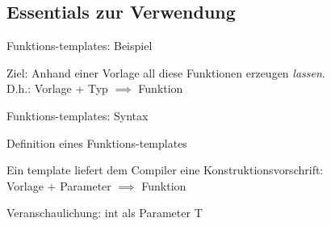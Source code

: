 \subsection{Essentials zur Verwendung}

\begin{frame}[t]{Funktions-templates: Beispiel}


	Ziel: Anhand einer Vorlage all diese Funktionen erzeugen \emph{lassen}.\\
	D.h.: Vorlage + Typ $\implies$ Funktion
	
	\vspace{2em}
	
	\onslide*<+> {  }
	\lstset{morecomment=[l]template}
	\onslide*<+> {  }
	\lstset{deletecomment=[l]template}
	\onslide*<+-> {  }
\end{frame}

\begin{frame}[fragile]{Funktions-templates: Syntax}
	\begin{block}{Definition eines Funktions-templates}
		
	\end{block}
	
	Ein template liefert dem Compiler eine Konstruktionsvorschrift:\\
	Vorlage + Parameter $\implies$ Funktion
	
	\pause
	\vspace{1em}
	
	\begin{block}{Veranschaulichung: int als Parameter T}
		
	\end{block}
\end{frame}

